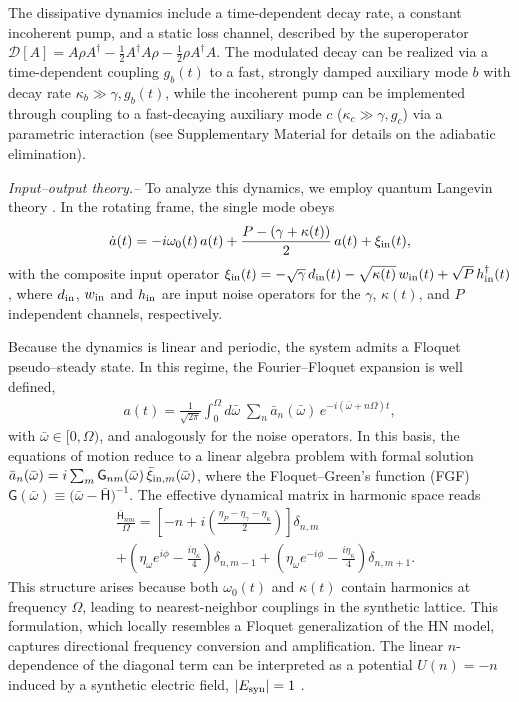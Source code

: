 \documentclass[prl,twocolumn,floatfix,10pt,superscriptaddress]{revtex4-2}
\newcommand{\msf}[1]{\mathsf{#1}}
\newcommand{\mcl}[1]{\mathcal{#1}}
\newcommand{\bomega}{{\bar{\omega}}}
\newcommand{\rmin}{{{\rm in}}}
\begin{document}
The dissipative dynamics include a time-dependent decay rate, a constant incoherent pump, and a static loss channel, described by the superoperator $\mcl{D}[A] = A \rho A^\dag - \tfrac{1}{2} A^\dag A \rho - \tfrac{1}{2} \rho A^\dag A$. The modulated decay can be realized via a time-dependent coupling $g_b(t)$ to a fast, strongly damped auxiliary mode $b$ with decay rate $\kappa_b \gg \gamma, g_b(t)$, while the incoherent pump can be implemented through coupling to a fast-decaying auxiliary mode $c$ ($\kappa_c \gg \gamma, g_c$) via a parametric interaction (see Supplementary Material for details on the adiabatic elimination).
 

{\it Input--output theory.--} To analyze this dynamics, we employ quantum Langevin theory \cite{Ramos2021}. In the rotating frame, the single mode obeys
\begin{align}
\dot{a}(t) = -i \omega_0(t)\, a(t) 
+ \frac{P -(\gamma+ \kappa(t))}{2}\, a(t)
+ \xi_\rmin(t), \label{eq:adot}
\end{align}
with the composite input operator
$\xi_\rmin(t) = - \sqrt{\gamma}\, d_\rmin(t)- \sqrt{\kappa(t)}\, w_\rmin(t) +\sqrt{P}\, h_\rmin^\dagger(t)$, where $d_\rmin$, $w_\rmin$ and $h_\rmin$ are input noise operators for the $\gamma$, $\kappa(t)$, and $P$ independent channels, respectively.

Because the dynamics is linear and periodic, the system admits a Floquet pseudo--steady state. In this regime, the Fourier--Floquet expansion is well defined,
\begin{align}
a(t) = \frac{1}{\sqrt{2\pi}}\int_0^{\Omega} d\bomega\; \sum_{n} \bar{a}_n(\bomega) \,
e^{-i(\bomega + n \Omega) t},\label{eq:at_a_n_bomega}
\end{align}
with $\bomega\in[0,\Omega)$, and analogously for the noise operators. In this basis, the equations of motion reduce to a linear algebra problem with formal solution $\bar{a}_n(\bomega) 
= i \sum_m \msf{G}_{nm}(\bomega)\, \bar{\xi}_{\rmin,m}(\bomega)$, 
where the Floquet--Green's function (FGF)
$\msf{G}(\bomega) \equiv \big(\bomega - \bar{\mathsf H}\big)^{-1}$. The effective dynamical matrix in harmonic space reads
\begin{align}\label{eq:Hnm_Sambe}
    &\frac{\bar{\mathsf{H}}_{n m}}{\Omega} = \left[ - n
+ i\left( \frac{\eta_P - \eta_{\gamma} - \eta_\kappa}{2} \right) \right] \delta_{n,m} \\
&+\left( \eta_\omega e^{i\phi} - \frac{i \eta_\kappa}{4} \right)\delta_{n,m-1}
+ \left( \eta_\omega e^{-i\phi} - \frac{i \eta_\kappa}{4}\right)\delta_{n,m+1}.\nonumber
\end{align}
This structure arises because both $\omega_0(t)$ and $\kappa(t)$ contain harmonics at frequency $\Omega$, leading to nearest-neighbor couplings in the synthetic lattice. This formulation, which locally resembles a Floquet generalization of the HN model, captures directional frequency conversion and amplification. The linear $n$-dependence of the diagonal term can be interpreted as a potential $U(n)=-n$ induced by a synthetic electric field, $|E_{\rm syn}| = 1$ \cite{GomezLeon2013,Martin2017}.
\end{document}
